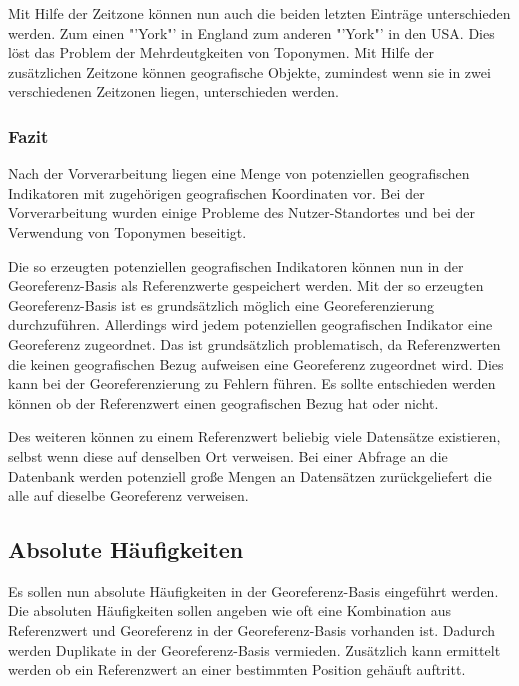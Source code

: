 				Mit Hilfe der Zeitzone können nun auch die beiden letzten Einträge unterschieden werden. 
				Zum einen "'York"' in England zum anderen "'York"' in den USA. 
				Dies löst das Problem der Mehrdeutgkeiten von Toponymen. 
				Mit Hilfe der zusätzlichen Zeitzone können geografische Objekte, zumindest wenn sie in zwei verschiedenen Zeitzonen liegen, unterschieden werden.

			\subsubsection{Fazit} 

				Nach der Vorverarbeitung liegen eine Menge von potenziellen geografischen Indikatoren mit zugehörigen geografischen Koordinaten vor.
				Bei der Vorverarbeitung wurden einige Probleme des Nutzer-Standortes und bei der Verwendung von Toponymen beseitigt.

				Die so erzeugten potenziellen geografischen Indikatoren können nun in der Georeferenz-Basis als Referenzwerte gespeichert werden.
				Mit der so erzeugten Georeferenz-Basis ist es grundsätzlich möglich eine Georeferenzierung durchzuführen. 
				Allerdings wird jedem potenziellen geografischen Indikator eine Georeferenz zugeordnet.
				Das ist grundsätzlich problematisch, da Referenzwerten die keinen geografischen Bezug aufweisen eine Georeferenz zugeordnet wird. 
				Dies kann bei der Georeferenzierung zu Fehlern führen.
				Es sollte entschieden werden können ob der Referenzwert einen geografischen Bezug hat oder nicht. 

				Des weiteren können zu einem Referenzwert beliebig viele Datensätze existieren, selbst wenn diese auf denselben Ort verweisen. 
				Bei einer Abfrage an die Datenbank werden potenziell große Mengen an Datensätzen zurückgeliefert die alle auf dieselbe Georeferenz verweisen.

		\subsection{Absolute Häufigkeiten}

			Es sollen nun absolute Häufigkeiten in der Georeferenz-Basis eingeführt werden.
			Die absoluten Häufigkeiten sollen angeben wie oft eine Kombination aus Referenzwert und Georeferenz in der Georeferenz-Basis vorhanden ist.
			Dadurch werden Duplikate in der Georeferenz-Basis vermieden.
			Zusätzlich kann ermittelt werden ob ein Referenzwert an einer bestimmten Position gehäuft auftritt.


